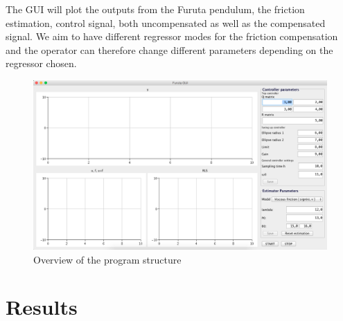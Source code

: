 \documentclass[10pt,a4paper]{article}
\begin{document}
The GUI will plot the outputs from the Furuta pendulum, the friction estimation, control signal, both uncompensated as well as the compensated signal. We aim to have different regressor modes for the friction compensation and the operator can therefore change different parameters depending on the regressor chosen. 

\begin{figure}[!htb]
\begin{center}
\includegraphics[width=1\textwidth]{gui.png}
\caption{Overview of the program structure}
\label{fig:gui}
\end{center}
\end{figure}
\section{Results}
\end{document}
